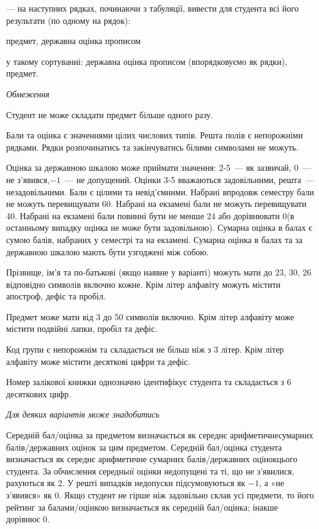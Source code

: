 \documentclass[11pt, ukrainian]{article}
\begin{document}
{\noindent}--- на наступних рядках, починаючи з табуляції, вивести для студента всі його результати (по одному на рядок):\par
предмет, державна оцінка прописом

{\noindent}у такому сортуванні: державна оцінка прописом (впорядковуємо як рядки), предмет.


\bigskip\textit{Обмеження}

Студент не може складати предмет більше одного разу.

Бали та оцінка є значеннями цілих числових типів. Решта полів є непорожніми рядками.
Рядки розпочинатись та закінчуватись білими символами не можуть.

Оцінка за державною шкалою може приймати значення: 2-5~--- як зазвичай, 0~--- не з’явився,$-1$~--- не допущений. 
Оцінки 3-5 вважаються задовільними, решта~--- незадовільними. 
Бали є цілими та невід’ємними.
Набрані впродовж семестру бали не можуть перевищувати 60. 
Набрані на екзамені бали не можуть перевищувати 40. 
Набрані на екзамені бали повинні бути не менше 24 або дорівнювати 0(в останньому випадку оцінка не може бути задовільною). 
Сумарна оцінка в балах є сумою балів, набраних у семестрі та на екзамені.
Сумарна оцінка в балах та за державною шкалою мають бути узгоджені між собою.

Прізвище, ім’я та по-батькові (якщо наявне у варіанті) можуть мати до 23, 30, 26 відповідно символів включно кожне. 
Крім літер алфавіту можуть містити апостроф, дефіс та пробіл.

Предмет може мати від 3 до 50 символів включно. 
Крім літер алфавіту може містити подвійні лапки, пробіл та дефіс.

Код групи є непорожнім та складається не більш ніж з 3 літер. 
Крім літер алфавіту може містити десяткові цифри та дефіс.


Номер залікової книжки однозначно ідентифікує студента та складається з 6 десяткових цифр. 

\bigskip\textit{Для деяких варіантів може знадобитись}

Середній бал/оцінка за предметом визначається як середнє арифметичнесумарних балів/державних оцінок за цим предметом. 
Середній бал/оцінка студента визначається як середнє арифметичне сумарних балів/державних оцінокцього студента. 
За обчислення середньої оцінки недопущені та ті, що не з’явилися, рахуються як 2.
У решті випадків недопуски підсумовуються як $-1$, а «не з’явився» як 0.
Якщо студент не гірше ніж задовільно склав усі предмети, 
то його рейтинг за балами/оцінкою визначається як середній бал/оцінка; інакше дорівнює 0.
\end{document}
